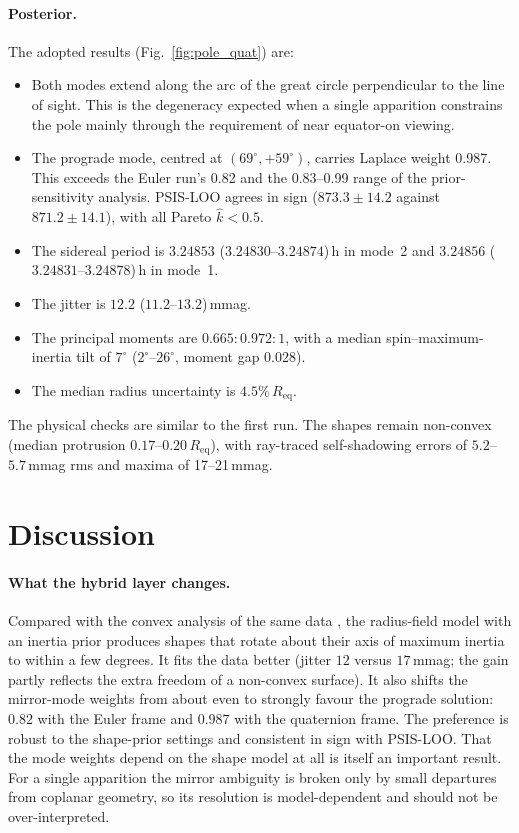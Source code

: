 \documentclass[11pt,a4paper]{article}
\theoremstyle{remark}
\newcommand{\Req}{R_{\mathrm{eq}}}
\begin{document}
\paragraph{Posterior.} The adopted results (Fig.~\ref{fig:pole_quat}) are:
\begin{itemize}[nosep]
\item Both modes extend along the arc of the great circle perpendicular to the line of sight. This is
  the degeneracy expected when a single apparition constrains the pole mainly through the requirement
  of near equator-on viewing.
\item The prograde mode, centred at $(69^\circ,+59^\circ)$, carries Laplace weight 0.987. This exceeds
  the Euler run's 0.82 and the 0.83--0.99 range of the prior-sensitivity analysis. PSIS-LOO agrees in
  sign ($873.3\pm14.2$ against $871.2\pm14.1$), with all Pareto $\hat k<0.5$.
\item The sidereal period is $3.24853$ ($3.24830$--$3.24874$)\,h in mode~2
  and $3.24856$ ($3.24831$--$3.24878$)\,h in mode~1.
\item The jitter is $12.2$ ($11.2$--$13.2$)\,mmag.
\item The principal moments are $0.665:0.972:1$, with a median spin--maximum-inertia tilt of
  $7^\circ$ ($2^\circ$--$26^\circ$, moment gap 0.028).
\item The median radius uncertainty is $4.5\%\,\Req$.
\end{itemize}
The physical checks are similar to the first run. The shapes remain non-convex (median protrusion
$0.17$--$0.20\,\Req$), with ray-traced self-shadowing errors of $5.2$--$5.7$\,mmag rms and maxima of
17--21\,mmag.


\section{Discussion}
\label{sec:discussion}

\paragraph{What the hybrid layer changes.} Compared with the convex analysis of the same data
\citep{lcinv_convex2026}, the radius-field model with an inertia prior produces shapes that rotate
about their axis of maximum inertia to within a few degrees. It fits the data better (jitter $12$
versus $17$\,mmag; the gain partly reflects the extra freedom of a non-convex surface). It also shifts
the mirror-mode weights from about even to strongly favour the prograde solution: $0.82$ with the Euler
frame and $0.987$ with the quaternion frame. The preference is robust to the shape-prior settings and
consistent in sign with PSIS-LOO. That the mode
weights depend on the shape model at all is itself an important result. For a single apparition the
mirror ambiguity is broken only by small departures from coplanar geometry, so its resolution is
model-dependent and should not be over-interpreted.
\end{document}
